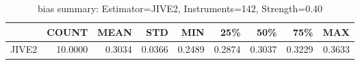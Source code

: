 \begin{table}[ht]
\centering
\caption{bias summary: Estimator=JIVE2, Instruments=142, Strength=0.40}
\begin{tabular}{lrrrrrrrr}
\toprule
 & COUNT & MEAN & STD & MIN & 25\% & 50\% & 75\% & MAX \\
\midrule
JIVE2 & 10.0000 & 0.3034 & 0.0366 & 0.2489 & 0.2874 & 0.3037 & 0.3229 & 0.3633 \\
\bottomrule
\end{tabular}
\end{table}
